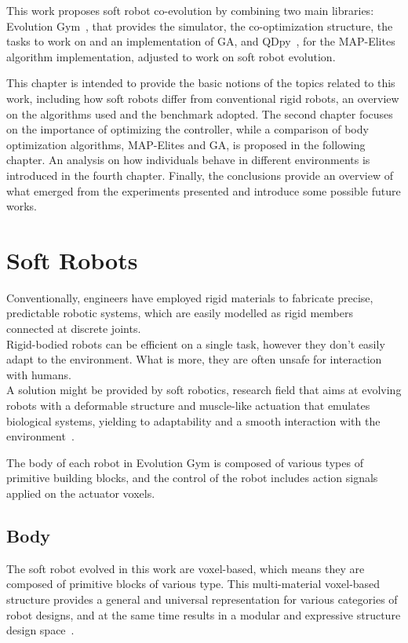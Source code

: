 This work proposes soft robot co-evolution by combining two main libraries: Evolution Gym~\cite{evogym}, that provides the simulator, the co-optimization structure, the tasks to work on and an implementation of GA, and QDpy~\cite{qdpy}, for the MAP-Elites algorithm implementation, adjusted to work on soft robot evolution.

This chapter is intended to provide the basic notions of the topics related to this work, including how soft robots differ from conventional rigid robots, an overview on the algorithms used and the benchmark adopted.
The second chapter focuses on the importance of optimizing the controller, while a comparison of body optimization algorithms, MAP-Elites and GA, is proposed in the following chapter.
An analysis on how individuals behave in different environments is introduced in the fourth chapter.
Finally, the conclusions provide an overview of what emerged from the experiments presented and introduce some possible future works.


\section{Soft Robots}
Conventionally, engineers have employed rigid materials to fabricate precise, predictable robotic systems, which are easily modelled as rigid members connected at discrete joints.\\
Rigid-bodied robots can be efficient on a single task, however they don't easily adapt to the environment.
What is more, they are often unsafe for interaction with humans.\\
A solution might be provided by soft robotics, research field that aims at evolving robots with a deformable structure and muscle-like actuation that emulates biological systems, yielding to adaptability and a smooth interaction with the environment~\cite{Rus2015}.

The body of each robot in Evolution Gym is composed of various types of primitive building blocks, and the control of the robot includes action signals applied on the actuator voxels.


\subsection{Body}
The soft robot evolved in this work are voxel-based, which means they are composed of primitive blocks of various type.
This multi-material voxel-based structure provides a general
and universal representation for various categories of robot designs, and at the same time results in a modular and expressive structure design space~\cite{bhatia2021evolution}.

